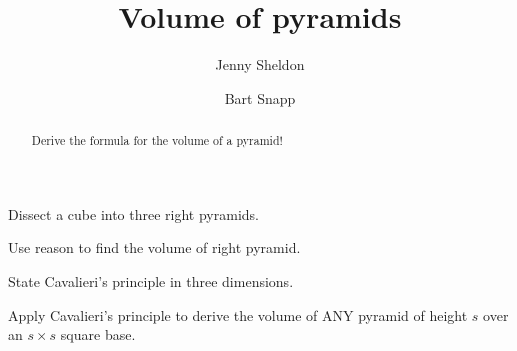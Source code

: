\documentclass[nooutcomes,noauthor,handout]{ximera}
\title{Volume of pyramids}
\author{Jenny Sheldon \and Bart Snapp}
\begin{document}
\begin{abstract}
  Derive the formula for the volume of a pyramid!
\end{abstract}
\maketitle


\begin{listOutcomes}
\item Dissect a cube into three right pyramids.
\item Use reason to find the volume of right pyramid.
\item State Cavalieri's principle in three dimensions.
\item Apply Cavalieri's principle to derive the volume of ANY pyramid
  of height $s$ over an $s\times s$ square base.
\end{listOutcomes}


\mynewpage
\end{document}
